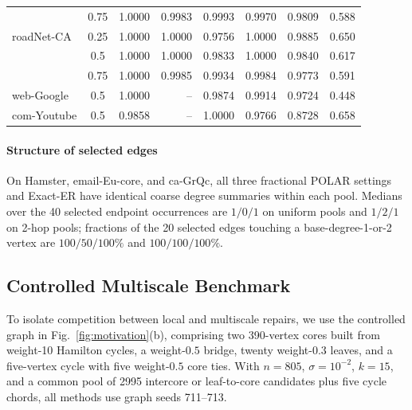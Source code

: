 \documentclass[conference]{IEEEtran}
\theoremstyle{definition}
\newcommand{\POLAR}{\textsc{POLAR}}
\begin{document}
\begin{table}[!t]
\begin{tabular}{@{}lc rrrrrr@{}}
 & 0.75 & 1.0000 & 0.9983 & 0.9993 & 0.9970 & 0.9809 & 0.588\\
roadNet-CA & 0.25 & 1.0000 & 1.0000 & 0.9756 & 1.0000 & 0.9885 & 0.650\\
 & 0.5 & 1.0000 & 1.0000 & 0.9833 & 1.0000 & 0.9840 & 0.617\\
 & 0.75 & 1.0000 & 0.9985 & 0.9934 & 0.9984 & 0.9773 & 0.591\\
web-Google & 0.5 & 1.0000 & -- & 0.9874 & 0.9914 & 0.9724 & 0.448\\
com-Youtube & 0.5 & 0.9858 & -- & 1.0000 & 0.9766 & 0.8728 & 0.658\\
\bottomrule
\end{tabular}
\end{table}

\paragraph{Structure of selected edges}
On Hamster, email-Eu-core, and ca-GrQc, all three fractional \POLAR{}
settings and Exact-ER have identical coarse degree summaries within
each pool. Medians over the 40 selected endpoint occurrences
are $1/0/1$ on uniform pools and $1/2/1$ on 2-hop pools; fractions
of the 20 selected edges touching a base-degree-1-or-2 vertex are
$100/50/100\%$ and $100/100/100\%$.

\subsection{Controlled Multiscale Benchmark}
To isolate competition between local and multiscale repairs, we use
the controlled graph in Fig.~\ref{fig:motivation}(b), comprising two
390-vertex cores built from weight-10 Hamilton cycles, a weight-$0.5$
bridge, twenty weight-$0.3$ leaves, and a five-vertex cycle with five
weight-$0.5$ core ties. With $n=805$, $\sigma=10^{-2}$, $k=15$, and a
common pool of 2995 intercore or leaf-to-core candidates plus five cycle
chords, all methods use graph seeds 711--713.
\end{document}
